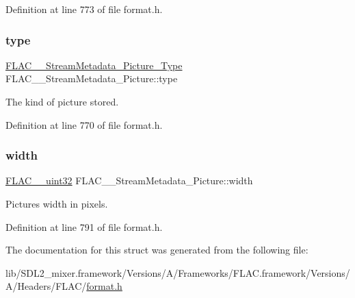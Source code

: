 Definition at line 773 of file format.\+h.

\mbox{\label{struct_f_l_a_c_____stream_metadata___picture_addc05a87a1da1ec7dd2301944ff2819c}} 
\subsubsection{\texorpdfstring{type}{type}}
{\footnotesize\ttfamily \mbox{\hyperlink{group__flac__format_gaf6d3e836cee023e0b8d897f1fdc9825d}{F\+L\+A\+C\+\_\+\+\_\+\+Stream\+Metadata\+\_\+\+Picture\+\_\+\+Type}} F\+L\+A\+C\+\_\+\+\_\+\+Stream\+Metadata\+\_\+\+Picture\+::type}

The kind of picture stored. 

Definition at line 770 of file format.\+h.

\mbox{\label{struct_f_l_a_c_____stream_metadata___picture_a18dc6cdef9fa6c815450671f631a1e04}} 
\subsubsection{\texorpdfstring{width}{width}}
{\footnotesize\ttfamily \mbox{\hyperlink{ordinals_8h_a9c4005ea7ef8d564b0cc993cdd0e4e5e}{F\+L\+A\+C\+\_\+\+\_\+uint32}} F\+L\+A\+C\+\_\+\+\_\+\+Stream\+Metadata\+\_\+\+Picture\+::width}

Picture\textquotesingle{}s width in pixels. 

Definition at line 791 of file format.\+h.



The documentation for this struct was generated from the following file\+:\begin{DoxyCompactItemize}
\item 
lib/\+S\+D\+L2\+\_\+mixer.\+framework/\+Versions/\+A/\+Frameworks/\+F\+L\+A\+C.\+framework/\+Versions/\+A/\+Headers/\+F\+L\+A\+C/\mbox{\hyperlink{format_8h}{format.\+h}}\end{DoxyCompactItemize}
